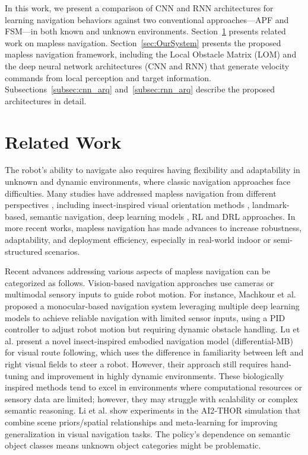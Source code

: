 \documentclass[robotics,article,submit,pdftex,moreauthors]{Definitions/mdpi}
\begin{document}
In this work, we present a comparison of CNN and RNN architectures for learning navigation behaviors against two conventional approaches—APF and FSM—in both known and unknown environments. Section~\ref{sec:rel_work} presents related work on mapless navigation. Section~\ref{sec:OurSystem} presents the proposed mapless navigation framework, including the Local Obstacle Matrix (LOM) and the deep neural network architectures (CNN and RNN) that generate velocity commands from local perception and target information. Subsections~\ref{subsec:cnn_arq} and~\ref{subsec:rnn_arq} describe the proposed architectures in detail.

\section{Related Work} \label{sec:rel_work} 

The robot's ability to navigate also requires having flexibility and adaptability in unknown and dynamic environments, where classic navigation approaches face difficulties. Many studies have addressed mapless navigation from different perspectives \citep{Mapless-Survey}, including insect-inspired visual orientation methods \citep{wang-2024}, landmark-based, semantic navigation, deep learning models \citep{SnapNav}, RL and DRL approaches\citep{CrowdMove, Target-driven, Automatic-Curr-L}. In more recent works, mapless navigation has made advances to increase robustness, adaptability, and deployment efficiency, especially in real-world indoor or semi-structured scenarios\citep{10.1007/978-3-031-63596-0_22}.

Recent advances addressing various aspects of mapless navigation can be categorized as follows. Vision-based navigation approaches use cameras or multimodal sensory inputs to guide robot motion. For instance, Machkour et al. \citep{Machkour2023} proposed a monocular-based navigation system leveraging multiple deep learning models to achieve reliable navigation with limited sensor inputs, using a PID controller to adjust robot motion but requiring dynamic obstacle handling. Lu et al. \citep{Lu2025} present a novel insect-inspired embodied navigation model (differential-MB) for visual route following, which uses the difference in familiarity between left and right visual fields to steer a robot. However, their approach still requires hand-tuning and improvement in highly dynamic environments. These biologically inspired methods tend to excel in environments where computational resources or sensory data are limited; however, they may struggle with scalability or complex semantic reasoning. Li et al. \citep{LI2021368} show experiments in the AI2‑THOR simulation that combine scene priors/spatial relationships and meta‑learning for improving generalization in visual navigation tasks. The policy’s dependence on semantic object classes means unknown object categories might be problematic.
\end{document}
